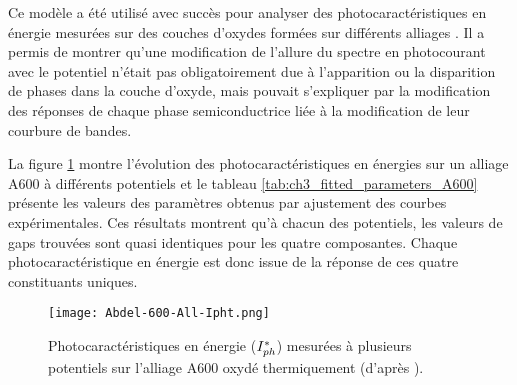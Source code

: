 \begin{refsection}
    Ce modèle a été utilisé avec succès pour analyser des photocaractéristiques en énergie
    mesurées sur des couches d’oxydes formées sur différents alliages \citep{Loucif2012, Srisrual2013, Guillotte2014}.
    Il a permis de montrer qu’une modification de l’allure du spectre en photocourant avec
    le potentiel n’était pas obligatoirement due à l’apparition ou la disparition de phases dans
    la couche d'oxyde, mais pouvait s’expliquer par la modification des réponses de chaque phase
    semiconductrice liée à la modification de leur courbure de bandes.
    
    La figure \ref{fig:ch3_CI_A600_Iph_Ipht} montre
    l'évolution des photocaractéristiques en énergies sur un alliage
    A600 à différents potentiels et le tableau \ref{tab:ch3_fitted_parameters_A600} présente les valeurs des paramètres
    obtenus par ajustement des courbes expérimentales.
    Ces résultats montrent qu’à chacun des potentiels, les valeurs de gaps trouvées sont quasi
    identiques pour les quatre composantes. Chaque photocaractéristique en énergie est donc issue de la réponse de ces
    quatre constituants uniques.


    \begin{figure}[H]
        \centering
        \texttt{[image: Abdel-600-All-Ipht.png]}
        \caption[Photocaractéristiques en énergie ($\ipht$) mesurées à plusieurs potentiels sur l'alliage A600
        oxydé thermiquement.]
        {Photocaractéristiques en énergie ($\ipht$) mesurées à plusieurs potentiels sur l'alliage A600
        oxydé thermiquement (d'après \citet{Petit2013}).}
        \label{fig:ch3_CI_A600_Iph_Ipht}
    \end{figure}


\end{refsection}

